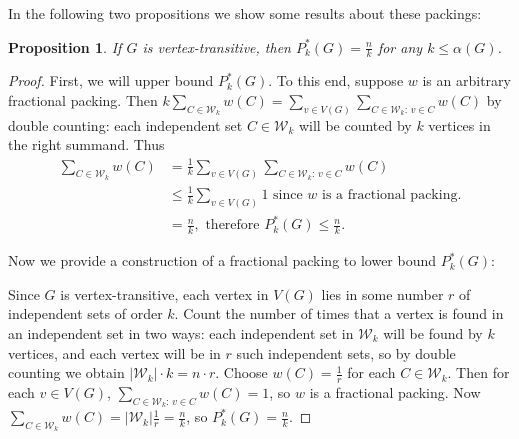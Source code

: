 \documentclass[12pt]{article}
\newtheorem{proposition}[theorem]{Proposition}
\begin{document}
In the following two propositions we show some results about these packings:
\begin{proposition}
\label{prop: fractional}
    If $G$ is vertex-transitive, then $P_k^*(G)=\frac{n}{k}$  for any $k\leq\alpha(G)$.
\end{proposition}
\begin{proof}
    First, we will upper bound $P_k^*(G)$. To this end, suppose $w$ is an arbitrary fractional packing. Then $k\sum_{C\in\mathcal{W}_k}w(C)=\sum_{v\in V(G)}\sum_{C\in\mathcal{W}_k:\,v\in C}w(C)$ by double counting: each independent set $C\in\mathcal{W}_k$ will be counted by $k$ vertices in the right summand. Thus \begin{align*}
        \sum_{C\in\mathcal{W}_k}w(C)&=\frac{1}{k}\sum_{v\in V(G)}\sum_{C\in\mathcal{W}_k:\,v\in C}w(C)\\
        &\leq\frac{1}{k}\sum_{v\in V(G)}1\text{ since $w$ is a fractional packing.}\\
        &=\frac{n}{k},\text{  therefore $P_k^*(G)\leq\frac{n}{k}$.}
    \end{align*}

    Now we  provide a construction of a fractional packing to lower bound $P_k^*(G)$:

    Since $G$ is vertex-transitive, each vertex in $V(G)$ lies in some number  $r$ of independent sets of order $k$. Count the number of times that a vertex is found in an independent set in two ways: each independent set in $\mathcal{W}_k$ will be found by $k$ vertices, and each vertex will be in $r$ such independent sets, so by double counting we obtain $|\mathcal{W}_k|\cdot k=n\cdot r$. Choose $w(C)=\frac{1}{r}$ for each $C\in\mathcal{W}_k$. Then for each $v\in V(G)$, $\sum_{C\in\mathcal{W}_k:\,v\in C}w(C)=1$, so $w$ is a fractional packing. Now $\sum_{C\in\mathcal{W}_k} w(C)=|\mathcal{W}_k|\frac{1}{r}=\frac{n}{k}$, so $P_k^*(G)=\frac{n}{k}$.
\end{proof}
\end{document}
